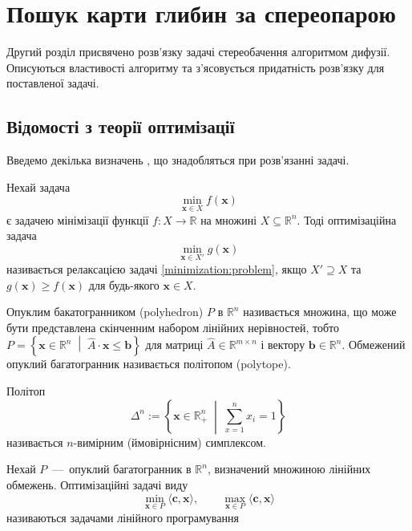 \chapter{Пошук карти глибин за спереопарою}

Другий розділ присвячено розв'язку задачі стереобачення алгоритмом дифузії.
Описуються властивості алгоритму та з'ясовується придатність
розв'язку для поставленої задачі.

\section{Відомості з теорії оптимізації}
Введемо декілька визначень \cite{overview:savchynskyy:diffusion},
що знадобляться при розв'язанні задачі.

Нехай задача
\begin{equation} \label{minimization:problem}
    \min_{\pmb{x} \in X} f \left( \pmb{x} \right)
\end{equation}
є задачею мінімізації функції $f: X \to \mathbb{R}$ на множині
$X \subseteq \mathbb{R}^n$.
Тоді оптимізаційна задача
\begin{equation*}
    \min_{\pmb{x} \in X'} g \left(\pmb{x} \right)
\end{equation*}
називається релаксацією задачі \eqref{minimization:problem},
якщо $X' \supseteq X$ та $g \left( \pmb{x} \right) \ge f \left( \pmb{x} \right)$
для будь-якого $\pmb{x} \in X$.

Опуклим бакатогранником (polyhedron) $P$ в $\mathbb{R}^n$ називається множина,
що може бути представлена скінченним набором лінійних нерівностей,
тобто
$P = \left\{
    \pmb{x} \in \mathbb{R}^n \; \middle| \;
    \hat{A} \cdot \pmb{x} \le \pmb{b}
\right\}$
для матриці $\hat{A} \in \mathbb{R}^{m \times n}$ і вектору
$\pmb{b} \in \mathbb{R}^n$.
Обмежений опуклий багатогранник називається політопом (polytope).

Політоп
\begin{equation} \label{simplex}
    \Delta^n := \left\{
        \pmb{x} \in \mathbb{R}^n_+ \; \middle| \; \sum \limits_{x = 1}^n x_i = 1
    \right\}
\end{equation}
називається $n$-вимірним (ймовірнісним) симплексом.

Нехай $P$~---~опуклий багатогранник в $\mathbb{R}^n$,
визначений множиною лінійних обмежень.
Оптимізаційні задачі виду
\begin{equation*}
    \min \limits_{\pmb{x} \in P} \langle \pmb{c}, \pmb{x} \rangle, \qquad
    \max \limits_{\pmb{x} \in P} \langle \pmb{c}, \pmb{x} \rangle
\end{equation*}
називаються задачами лінійного програмування

